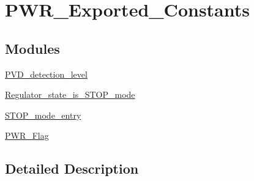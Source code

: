 \hypertarget{group___p_w_r___exported___constants}{}\section{P\+W\+R\+\_\+\+Exported\+\_\+\+Constants}
\label{group___p_w_r___exported___constants}
\subsection*{Modules}
\begin{DoxyCompactItemize}
\item 
\mbox{\hyperlink{group___p_v_d__detection__level}{P\+V\+D\+\_\+detection\+\_\+level}}
\item 
\mbox{\hyperlink{group___regulator__state__is___s_t_o_p__mode}{Regulator\+\_\+state\+\_\+is\+\_\+\+S\+T\+O\+P\+\_\+mode}}
\item 
\mbox{\hyperlink{group___s_t_o_p__mode__entry}{S\+T\+O\+P\+\_\+mode\+\_\+entry}}
\item 
\mbox{\hyperlink{group___p_w_r___flag}{P\+W\+R\+\_\+\+Flag}}
\end{DoxyCompactItemize}


\subsection{Detailed Description}
